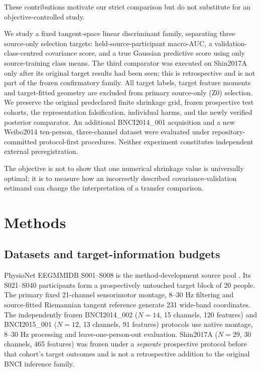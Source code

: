 \documentclass[12pt,a4paper]{article}
\begin{document}
These contributions motivate our strict comparison but do not substitute
for an objective-controlled study.

We study a fixed tangent-space linear discriminant family, separating
three source-only selection targets: held-source-participant
macro-AUC, a validation-class-centred covariance score, and a true
Gaussian predictive score using only source-training class means.
The third comparator was executed on Shin2017A only after its original
target results had been seen; this is retrospective and is not part of
the frozen confirmatory family. All target labels, target feature
moments and target-fitted geometry are excluded from primary source-only
(Z0) selection. We preserve the original predeclared finite shrinkage grid,
frozen prospective test cohorts, the representation falsification,
individual harms, and the newly verified posterior comparator. An additional BNCI2014\_001 acquisition and a new Weibo2014
ten-person, three-channel dataset were evaluated under
repository-committed protocol-first procedures. Neither experiment
constitutes independent external preregistration.

The objective is not to show
that one numerical shrinkage value is universally optimal; it is to measure
how an incorrectly described covariance-validation estimand can change
the interpretation of a transfer comparison.





\section{Methods}
\subsection{Datasets and target-information budgets}
PhysioNet EEGMMIDB S001--S008 is the method-development source pool
\cite{schalk2009eegmmidb,schalk2004bci2000}.
Its S021--S040 participants form a prospectively untouched target block
of 20 people. The primary fixed 21-channel sensorimotor montage, 8--30 Hz
filtering and source-fitted Riemannian tangent reference generate 231
wide-band coordinates. The independently frozen BNCI2014\_002
(\(N=14\), 15 channels, 120 features) and BNCI2015\_001
(\(N=12\), 13 channels, 91 features) protocols use native montage,
8--30 Hz processing and leave-one-person-out evaluation. Shin2017A
(\(N=29\), 30 channels, 465 features) was frozen under a \emph{separate}
prospective protocol before that cohort's target outcomes and is not a
retrospective addition to the original BNCI inference family.
\end{document}
